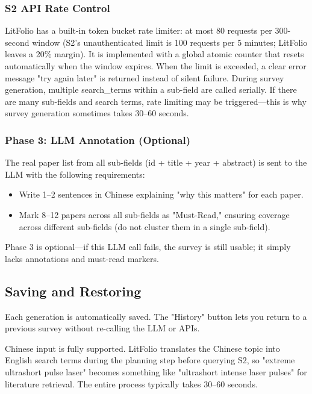 \subsubsection{S2 API Rate Control}

LitFolio has a built-in token bucket rate limiter: at most 80 requests per 300-second window (S2's
unauthenticated limit is 100 requests per 5 minutes; LitFolio leaves a 20\% margin). It is
implemented with a global atomic counter that resets automatically when the window expires. When the
limit is exceeded, a clear error message "try again later" is returned instead of silent failure.
During survey generation, multiple search\_terms within a sub-field are called serially. If there
are many sub-fields and search terms, rate limiting may be triggered---this is why survey generation
sometimes takes 30--60 seconds.

\subsubsection{Phase 3: LLM Annotation (Optional)}

The real paper list from all sub-fields (id + title + year + abstract) is sent to the LLM with the
following requirements:

\begin{itemize}
  \item Write 1--2 sentences in Chinese explaining "why this matters" for each paper.
  \item Mark 8--12 papers across all sub-fields as "Must-Read," ensuring coverage across different
    sub-fields (do not cluster them in a single sub-field).
\end{itemize}

Phase 3 is optional---if this LLM call fails, the survey is still usable; it simply lacks
annotations and must-read markers.

\subsection{Saving and Restoring}

Each generation is automatically saved. The "History" button lets you return to a previous survey
without re-calling the LLM or APIs.

\begin{tipbox}
Chinese input is fully supported. LitFolio translates the Chinese topic into English search terms
during the planning step before querying S2, so "extreme ultrashort pulse laser" becomes something
like "ultrashort intense laser pulses" for literature retrieval. The entire process typically takes
30--60 seconds.
\end{tipbox}

